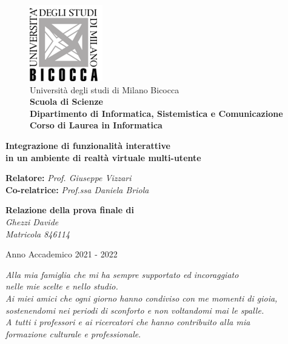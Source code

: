 \documentclass[11pt, openany]{book}
\begin{document}
\begin{titlepage}
\begin{figure}
            \caption*{
                Università degli studi di Milano Bicocca \\
                \textbf{Scuola di Scienze} \\
                \textbf{Dipartimento di Informatica, Sistemistica e Comunicazione} \\
                \textbf{Corso di Laurea in Informatica} \\
                }
            \includegraphics[]{Immagini/logo_bicocca.png}
\end{figure}
\begin{center}
        \vspace{2cm}
        \textbf{\Huge
        Integrazione di funzionalità interattive\\in un ambiente di realtà virtuale multi-utente}
        \vspace{4cm}
        \begin{FlushLeft}
        \Large
            \textbf{Relatore: } \textit{Prof. Giuseppe Vizzari}
            \\
            \textbf{Co-relatrice: } \textit{Prof.ssa Daniela Briola}
        \end{FlushLeft}

        \vspace{2cm}
        \begin{FlushRight}
        \Large
            \textbf{Relazione della prova finale di}
            \\
            \textit{Ghezzi Davide \\ Matricola 846114}
        \end{FlushRight}

        \large \vspace*{\fill} Anno Accademico 2021 - 2022
    \end{center}
\newpage
\end{titlepage}
\newpage
\begin{midpage}
\begin{center}
\begin{FlushRight}
 \textit{Alla mia famiglia che mi ha sempre supportato ed incoraggiato \\nelle mie
scelte e nello studio.
\\Ai miei amici che ogni giorno hanno condiviso con me momenti di gioia, \\sostenendomi nei periodi di sconforto e non voltandomi mai le spalle.
\\A tutti i professori e ai ricercatori che hanno contribuito alla mia \\formazione culturale e professionale}.   
\end{FlushRight}
\end{center}
\end{midpage}
\end{document}
